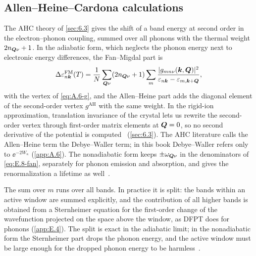 \subsection{Allen--Heine--Cardona calculations}

The AHC theory of \cref{sec:6.3} gives the shift of a band energy at second order in the electron--phonon coupling, summed over all phonons with the thermal weight $2n_{\bm{Q}\nu} + 1$. In the adiabatic form, which neglects the phonon energy next to electronic energy differences, the Fan--Migdal part is
\begin{equation}
  \Delta\varepsilon^{\mathrm{FM}}_{n\bm{k}}(T) = \frac{1}{N}\sum_{\bm{Q}\nu}(2n_{\bm{Q}\nu} + 1)\sum_m\frac{|g_{mn\nu}(\bm{k},\bm{Q})|^2}{\varepsilon_{n\bm{k}} - \varepsilon_{m,\bm{k}+\bm{Q}}} ,
  \label{eq:E.8-fan}
\end{equation}
with the vertex of \cref{eq:A.6-g}, and the Allen--Heine part adds the diagonal element of the second-order vertex $g^{\mathrm{AH}}$ with the same weight. In the rigid-ion approximation, translation invariance of the crystal lets us rewrite the second-order vertex through first-order matrix elements at $\bm{Q} = 0$, so no second derivative of the potential is computed~\cite[Eqs.~(11) and~(15)]{ponce2015temperature} (\cref{sec:6.3}). The AHC literature calls the Allen--Heine term the Debye--Waller term; in this book Debye--Waller refers only to $\ee^{-2W_\kappa}$ (\cref{app:A.6}). The nonadiabatic form keeps $\pm\omega_{\bm{Q}\nu}$ in the denominators of \cref{eq:E.8-fan}, separately for phonon emission and absorption, and gives the renormalization a lifetime as well~\cite[Eq.~(16)]{ponce2015temperature}.

The sum over $m$ runs over all bands. In practice it is split: the bands within an active window are summed explicitly, and the contribution of all higher bands is obtained from a Sternheimer equation for the first-order change of the wavefunction projected on the space above the window, as DFPT does for phonons (\cref{app:E.4}). The split is exact in the adiabatic limit; in the nonadiabatic form the Sternheimer part drops the phonon energy, and the active window must be large enough for the dropped phonon energy to be harmless~\cite[below Eq.~(16)]{ponce2015temperature}.

